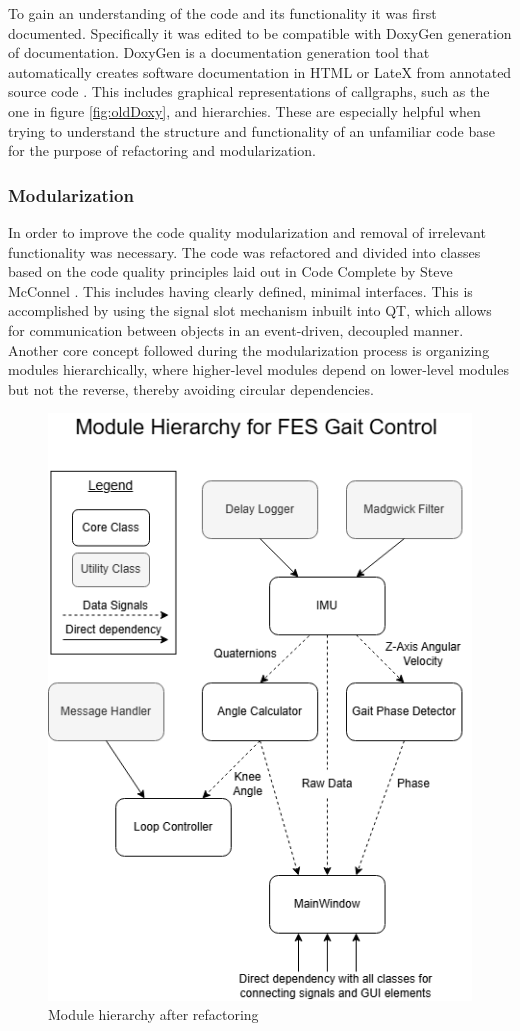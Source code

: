 To gain an understanding of the code and its functionality it was first documented. Specifically it was edited to be compatible with DoxyGen generation of documentation. DoxyGen is a documentation generation tool that automatically creates software documentation in HTML or LateX from annotated source code \cite{noauthor_doxygen_nodate}. This includes graphical representations of callgraphs, such as the one in figure \ref{fig:oldDoxy}, and hierarchies. These are especially helpful when trying to understand the structure and functionality of an unfamiliar code base for the purpose of refactoring and modularization.  


\subsubsection{Modularization}

In order to improve the code quality modularization and removal of irrelevant functionality was necessary. The code was refactored and divided into classes based on the code quality principles laid out in Code Complete by Steve McConnel \cite{steve_mcconnell_code_nodate}. This includes having clearly defined, minimal interfaces. This is accomplished by using the signal slot mechanism inbuilt into QT, which allows for communication between objects in an event-driven, decoupled manner. Another core concept followed during the modularization process is organizing modules hierarchically, where higher-level modules depend on lower-level modules but not the reverse, thereby avoiding circular dependencies. 

\begin{figure} [h]
    \centering
    \includegraphics[width=0.6\linewidth]{images/gaitcontrol.png}
    \caption{Module hierarchy after refactoring}
    \label{fig:modulehier}
\end{figure}

